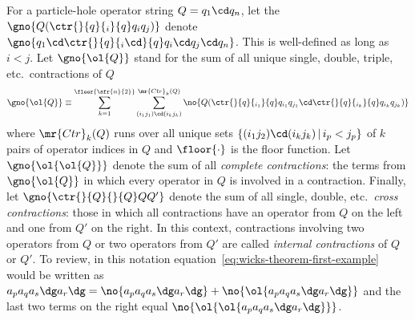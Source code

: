 \begin{ntt}\label{ntt:contraction-notation}
For a particle-hole operator string $Q=q_1\cd q_n$, let the $\gno{Q(\ctr{}{q}{_i}{q}q_iq_j)}$ denote $\gno{q_1\cd\ctr{}{q}{_i\cd}{q}q_i\cd q_j\cd q_n}$.
This is well-defined as long as $i<j$.
Let $\gno{\ol{Q}}$ stand for the sum of all unique single, double, triple, etc.\ contractions of $Q$
\begin{align*}
  \gno{\ol{Q}}
\equiv
  \sum_{k=1}^{\floor{\sfr{n}{2}}}
  \sum_{(i_1j_1)\cd(i_kj_k)}^{\mr{Ctr}_k(Q)}
  \no{Q(
    \ctr{}{q}{_{i_1}}{q}
    q_{i_1}q_{j_1}
    \cd
    \ctr{}{q}{_{i_k}}{q}
    q_{i_k}q_{j_k}
  )}
\end{align*}
where $\mr{Ctr}_k(Q)$ runs over all unique sets $\{(i_1j_2)\cd(i_kj_k)\,|\,i_p<j_p\}$ of $k$ pairs of operator indices in $Q$ and $\floor{\cdot}$ is the floor function.
Let $\gno{\ol{\ol{Q}}}$ denote the sum of all \textit{complete contractions}: the terms from $\gno{\ol{Q}}$ in which every operator in $Q$ is involved in a contraction.
Finally, let $\gno{\ctr{}{Q}{}{Q} QQ'}$ denote the sum of all single, double, etc.\ \textit{cross contractions}: those in which all contractions have an operator from $Q$ on the left and one from $Q'$ on the right.
In this context, contractions involving two operators from $Q$ or two operators from $Q'$ are called \textit{internal contractions} of $Q$ or $Q'$.
To review, in this notation equation~\ref{eq:wicks-theorem-first-example} would be written as
$
  a_p a_q a_s\dg a_r\dg
=
  \no{a_pa_qa_s\dg a_r\dg}
+
  \no{\ol{a_pa_qa_s\dg a_r\dg}}
$
and the last two terms on the right equal
$
  \no{\ol{\ol{a_pa_qa_s\dg a_r\dg}}}
$.
\end{ntt}

